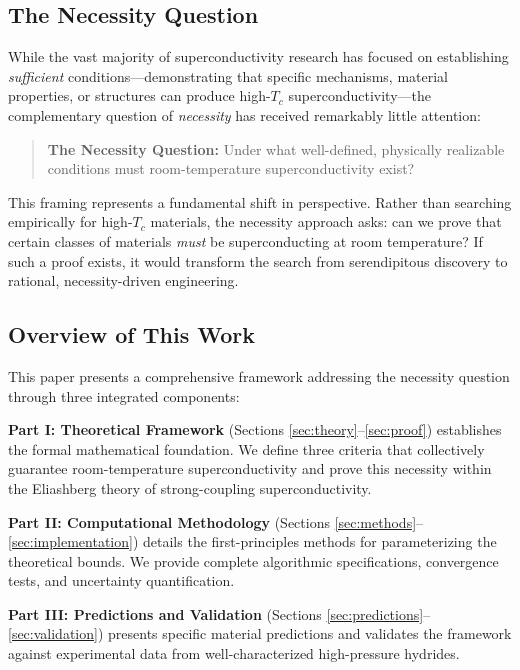 \documentclass[11pt,a4paper]{article}
\theoremstyle{definition}
\begin{document}
\subsection{The Necessity Question}

While the vast majority of superconductivity research has focused on establishing \textit{sufficient} conditions—demonstrating that specific mechanisms, material properties, or structures can produce high-$T_c$ superconductivity—the complementary question of \textit{necessity} has received remarkably little attention:

\begin{quote}
\textbf{The Necessity Question:} Under what well-defined, physically realizable conditions must room-temperature superconductivity exist?
\end{quote}

This framing represents a fundamental shift in perspective. Rather than searching empirically for high-$T_c$ materials, the necessity approach asks: can we prove that certain classes of materials \textit{must} be superconducting at room temperature? If such a proof exists, it would transform the search from serendipitous discovery to rational, necessity-driven engineering.

\subsection{Overview of This Work}

This paper presents a comprehensive framework addressing the necessity question through three integrated components:

\textbf{Part I: Theoretical Framework} (Sections \ref{sec:theory}--\ref{sec:proof}) establishes the formal mathematical foundation. We define three criteria that collectively guarantee room-temperature superconductivity and prove this necessity within the Eliashberg theory of strong-coupling superconductivity.

\textbf{Part II: Computational Methodology} (Sections \ref{sec:methods}--\ref{sec:implementation}) details the first-principles methods for parameterizing the theoretical bounds. We provide complete algorithmic specifications, convergence tests, and uncertainty quantification.

\textbf{Part III: Predictions and Validation} (Sections \ref{sec:predictions}--\ref{sec:validation}) presents specific material predictions and validates the framework against experimental data from well-characterized high-pressure hydrides.
\end{document}
